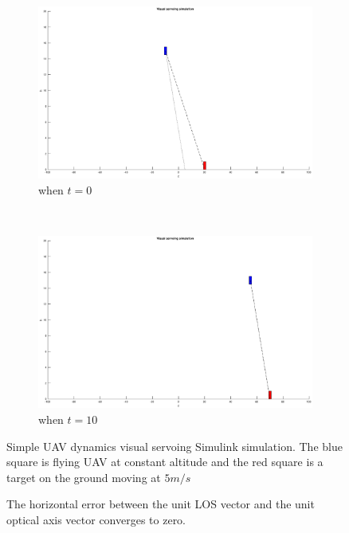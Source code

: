 \begin{figure}
	\centering
	\begin{subfigure}[b]{0.45\textwidth}
		\includegraphics[width=\textwidth]{images/simple_zero}
		\caption{when $t=0$}
	\end{subfigure}
	~ %
	\begin{subfigure}[b]{0.45\textwidth}
		\includegraphics[width=\textwidth]{images/simple_ten}
		\caption{when $t=10$}
	\end{subfigure}
	\caption{Simple UAV dynamics visual servoing Simulink simulation. The blue square is flying UAV at constant altitude and the red square is a target on the ground moving at $5m/s$}\label{fig:animals}
	\label{simple_simulation}
\end{figure}
\begin{figure}[thpb]
	\centering
	\caption{The horizontal error between the unit LOS vector and the unit optical axis vector converges to zero.}
	\label{simple_ex}
\end{figure}